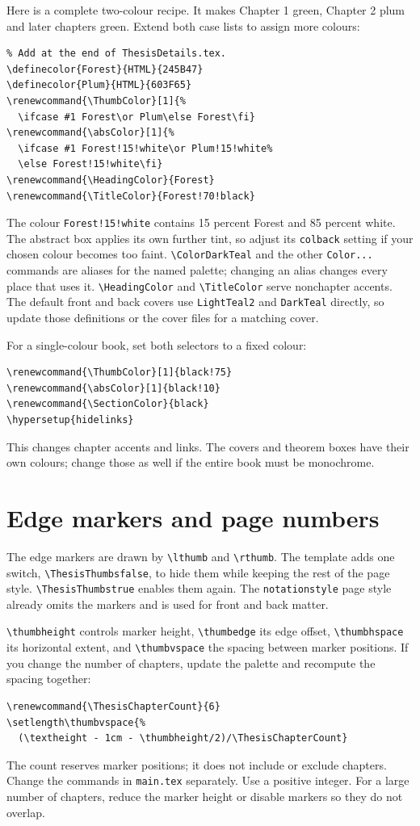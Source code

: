 Here is a complete two-colour recipe. It makes Chapter 1 green, Chapter 2 plum
and later chapters green. Extend both case lists to assign more colours:
\begin{lstlisting}
% Add at the end of ThesisDetails.tex.
\definecolor{Forest}{HTML}{245B47}
\definecolor{Plum}{HTML}{603F65}
\renewcommand{\ThumbColor}[1]{%
  \ifcase #1 Forest\or Plum\else Forest\fi}
\renewcommand{\absColor}[1]{%
  \ifcase #1 Forest!15!white\or Plum!15!white%
  \else Forest!15!white\fi}
\renewcommand{\HeadingColor}{Forest}
\renewcommand{\TitleColor}{Forest!70!black}
\end{lstlisting}
The colour \texttt{Forest!15!white} contains 15 percent Forest and 85 percent
white. The abstract box applies its own further tint, so adjust its
\texttt{colback} setting if your chosen colour becomes too faint.
\verb|\ColorDarkTeal| and the other \texttt{Color...} commands are aliases for
the named palette; changing an alias changes every place that uses it.
\verb|\HeadingColor| and \verb|\TitleColor| serve nonchapter accents.
The default front and back covers use \texttt{LightTeal2} and \texttt{DarkTeal}
directly, so update those definitions or the cover files for a matching cover.

For a single-colour book, set both selectors to a fixed colour:
\begin{lstlisting}
\renewcommand{\ThumbColor}[1]{black!75}
\renewcommand{\absColor}[1]{black!10}
\renewcommand{\SectionColor}{black}
\hypersetup{hidelinks}
\end{lstlisting}
This changes chapter accents and links. The covers and theorem boxes have their
own colours; change those as well if the entire book must be monochrome.

\section{Edge markers and page numbers}
The edge markers are drawn by \verb|\lthumb| and \verb|\rthumb|. The template
adds one switch, \verb|\ThesisThumbsfalse|, to hide them while keeping the rest
of the page style. \verb|\ThesisThumbstrue| enables them again. The
\texttt{notationstyle} page style already omits the markers and is used for
front and back matter.

\verb|\thumbheight| controls marker height, \verb|\thumbedge| its edge offset,
\verb|\thumbhspace| its horizontal extent, and \verb|\thumbvspace| the spacing
between marker positions. If you change the number of chapters, update the
palette and recompute the spacing together:
\begin{lstlisting}
\renewcommand{\ThesisChapterCount}{6}
\setlength\thumbvspace{%
  (\textheight - 1cm - \thumbheight/2)/\ThesisChapterCount}
\end{lstlisting}
The count reserves marker positions; it does not include or exclude chapters.
Change the \verb|| commands in \texttt{main.tex} separately.
Use a positive integer. For a large number of chapters, reduce the marker
height or disable markers so they do not overlap.

